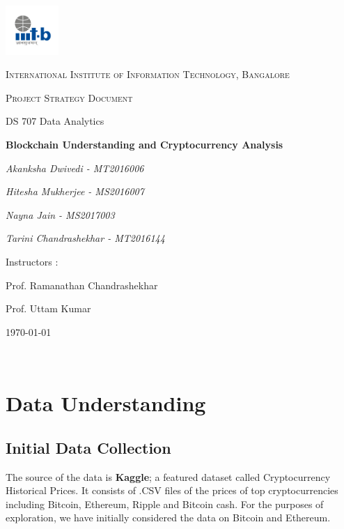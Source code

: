 \documentclass{article}
\begin{document}
\begin{titlepage}
	\centering
	\includegraphics[width=0.15\textwidth]{IIIT-B_logo.jpg}\par\vspace{1cm}
	{\scshape\LARGE International Institute of Information Technology, Bangalore \par}
	\vspace{1cm}
	{\scshape\Large Project Strategy Document\par}
	{\Large  DS 707 Data Analytics\par}
	\vspace{1.5cm}
	{\huge\bfseries Blockchain Understanding and Cryptocurrency Analysis \par}
	\vspace{2cm}
	{\Large\itshape Akanksha Dwivedi - MT2016006\par}
	{\Large\itshape Hitesha Mukherjee - MS2016007\par}
	{\Large\itshape Nayna Jain - MS2017003\par}
	{\Large\itshape Tarini Chandrashekhar - MT2016144\par}
	\vfill
	Instructors : \par
	Prof. Ramanathan Chandrashekhar
	\par
	Prof. Uttam Kumar

	\vfill
	{\large \today\par}
\end{titlepage}

\newpage

\tableofcontents

\newpage
\justify

\

\section{Data Understanding}

\subsection{Initial Data Collection }

The source of the data is \textbf{Kaggle}; a featured dataset called Cryptocurrency Historical Prices. It consists of .CSV files of the prices of top cryptocurrencies including Bitcoin, Ethereum, Ripple and Bitcoin cash. For the purposes of exploration, we have initially considered the data on Bitcoin and Ethereum. 
\end{document}
